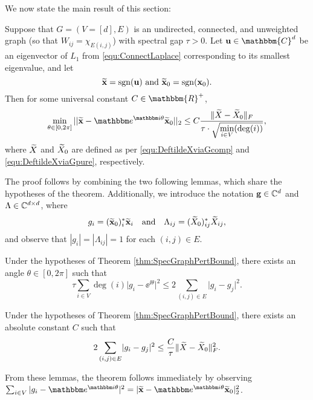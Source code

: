 We now state the main result of this section:

\begin{theorem}
Suppose that $G = (V=[d], E)$ is an undirected, connected, and unweighted graph (so that $W_{ij} = \chi_{E(i, j)}$) with spectral gap $\tau > 0$.  Let ${\bf u} \in \mathbbm{C}^d$ be an eigenvector of $L_1$ from \eqref{equ:ConnectLaplace} corresponding to its smallest eigenvalue, and let \[\widetilde{\bf x} = \sgn({\bf u}) \ \text{and} \ \tx_0 = \sgn(\x_0).\] Then for some universal constant $C \in \mathbbm{R}^+$, \[\min_{\theta \in [0, 2\pi]} ||\tx - \ee^{\ii \theta} \tx_0||_2 \le C \bigfrac{\|\tX - \widetilde{\X}_0\|_F}{\tau \cdot \sqrt{\min_{i \in V}(\deg(i))}},\] where $\widetilde{X}$ and $\widetilde{X}_0$ are defined as per \eqref{equ:DeftildeXviaGcomp} and \eqref{equ:DeftildeXviaGpure}, respectively. %
\label{thm:SpecGraphPertBound}
\end{theorem}

The proof follows by combining the two following lemmas, which share the hypotheses of the theorem.  Additionally, we introduce the notation ${\bf g} \in \mathbb{C}^d$ and $\Lambda \in \mathbb{C}^{d \times d}$, where $$g_i = (\widetilde{\mathbf x}_0)^*_i \widetilde{\mathbf x}_i \quad \text{and} \quad \Lambda_{ij} = (\widetilde{X}_0)^*_{ij} \widetilde{X}_{ij},$$ and observe that $|g_i| = |\Lambda_{ij}| = 1$ for each $(i, j) \in E$.

\begin{lemma}
Under the hypotheses of Theorem \ref{thm:SpecGraphPertBound}, there exists an angle $\theta \in [0, 2\pi]$ such that \[\tau \sum_{i \in V} \deg(i) \lvert g_i - \ee^{\ii \theta} \rvert^2 \le 2 \sum_{(i, j) \in E} \lvert g_i - g_j \rvert^2.\]
\label{lem:gbound1}
\end{lemma}

\begin{lemma}
Under the hypotheses of Theorem \ref{thm:SpecGraphPertBound}, there exists an absolute constant $C$ such that \[2\sum_{(i, j) \in E} \lvert g_i - g_j \rvert^2 \le \dfrac{C}{\tau} \lVert \widetilde{X} - \widetilde{X}_0 \rVert^2_F.\]
\label{lem:gbound2}
\end{lemma}

From these lemmas, the theorem follows immediately by observing $\sum_{i \in V} |g_i - \ee^{\ii \theta}|^2 = \lvert \tx - \ee^{\ii \theta} \tx_0 \rvert_2^2$.

